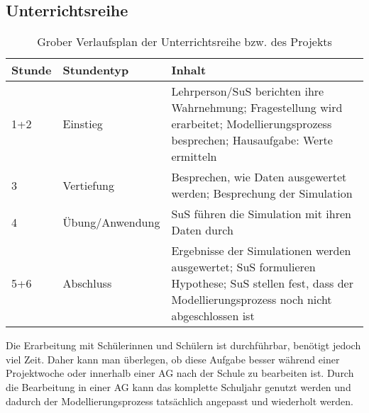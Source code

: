 \subsection{Unterrichtsreihe}
\begin{table}
\caption{Grober Verlaufsplan der Unterrichtsreihe bzw. des Projekts}\label{tab:schule_reihe}
\begin{tabular}{L{0.1\textwidth}L{0.2\textwidth}L{0.6\textwidth}}
\textbf{Stunde} & \textbf{Stundentyp} & \textbf{Inhalt}\\
+2 & Einstieg & Lehrperson/SuS berichten ihre Wahrnehmung; Fragestellung wird erarbeitet; Modellierungsprozess besprechen; Hausaufgabe: Werte ermitteln\\
3 & Vertiefung & Besprechen, wie Daten ausgewertet werden; Besprechung der Simulation\\
4 & Übung/Anwendung & SuS führen die Simulation mit ihren Daten durch\\
5+6 & Abschluss & Ergebnisse der Simulationen werden ausgewertet; SuS formulieren Hypothese; SuS stellen fest, dass der Modellierungsprozess noch nicht abgeschlossen ist
\end{tabular}
\end{table}

Die Erarbeitung mit Schülerinnen und Schülern ist durchführbar, benötigt jedoch viel Zeit. Daher kann man überlegen, ob diese Aufgabe besser während einer Projektwoche oder innerhalb einer AG nach der Schule zu bearbeiten ist. Durch die Bearbeitung in einer AG kann das komplette Schuljahr genutzt werden und dadurch der Modellierungsprozess tatsächlich angepasst und wiederholt werden.
